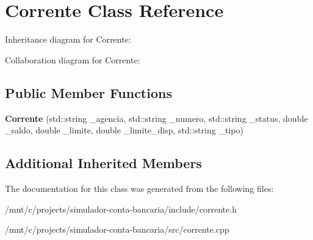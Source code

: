 \hypertarget{classCorrente}{}\section{Corrente Class Reference}
\label{classCorrente}


Inheritance diagram for Corrente\+:


Collaboration diagram for Corrente\+:
\subsection*{Public Member Functions}
\begin{DoxyCompactItemize}
\item 
\mbox{\label{classCorrente_aaf195bdb32a597d6936bbc4e92cfee24}} 
{\bfseries Corrente} (std\+::string \+\_\+agencia, std\+::string \+\_\+numero, std\+::string \+\_\+status, double \+\_\+saldo, double \+\_\+limite, double \+\_\+limite\+\_\+disp, std\+::string \+\_\+tipo)
\end{DoxyCompactItemize}
\subsection*{Additional Inherited Members}


The documentation for this class was generated from the following files\+:\begin{DoxyCompactItemize}
\item 
/mnt/c/projects/simulador-\/conta-\/bancaria/include/corrente.\+h\item 
/mnt/c/projects/simulador-\/conta-\/bancaria/src/corrente.\+cpp\end{DoxyCompactItemize}
